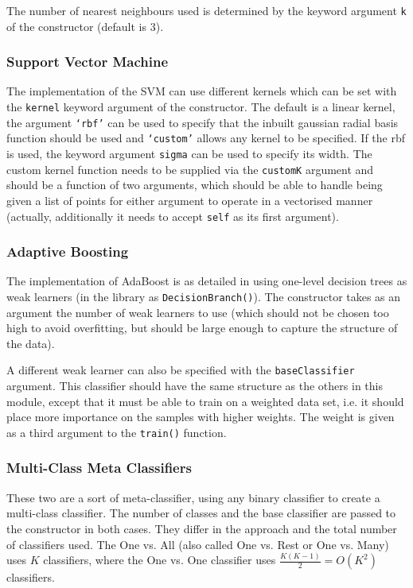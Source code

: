 \documentclass[a4paper]{article}
\begin{document}
The number of nearest neighbours used is determined by the keyword argument \texttt{k} of the constructor (default is 3).

\subsubsection{Support Vector Machine}
The implementation of the SVM can use different kernels which can be set with the \texttt{kernel} keyword argument of the constructor. The default is a linear kernel, the argument \texttt{`rbf'} can be used to specify that the inbuilt gaussian radial basis function should be used and \texttt{`custom'} allows any kernel to be specified. If the rbf is used, the keyword argument \texttt{sigma} can be used to specify its width. The custom kernel function needs to be supplied via the \texttt{customK} argument and should be a function of two arguments, which should be able to handle being given a list of points for either argument to operate in a vectorised manner (actually, additionally it needs to accept \texttt{self} as its first argument).

\subsubsection{Adaptive Boosting}
The implementation of AdaBoost is as detailed in \cite{PRML} using one-level decision trees as weak learners (in the library as \texttt{DecisionBranch()}). The constructor takes as an argument the number of weak learners to use (which should not be chosen too high to avoid overfitting, but should be large enough to capture the structure of the data).

A different weak learner can also be specified with the \texttt{baseClassifier} argument. This classifier should have the same structure as the others in this module, except that it must be able to train on a weighted data set, i.e. it should place more importance on the samples with higher weights. The weight is given as a third argument to the \texttt{train()} function.

\subsubsection{Multi-Class Meta Classifiers}
These two are a sort of meta-classifier, using any binary classifier to create a multi-class classifier. The number of classes and the base classifier are passed to the constructor in both cases. They differ in the approach and the total number of classifiers used. The One vs. All (also called One vs. Rest or One vs. Many) uses $K$ classifiers, where the One vs. One classifier uses $\frac{K(K-1)}{2} = O(K^2)$ classifiers.
\end{document}
